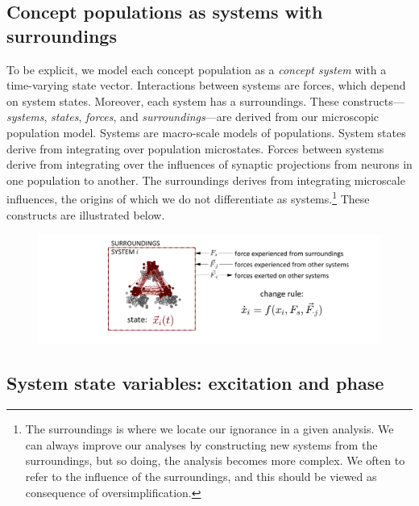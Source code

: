 \subsection{{\textbf{Concept populations as systems with surroundings}}} 

To be explicit, we model each concept population as a \textit{concept system} with a time-varying state vector. Interactions between systems are forces, which depend on system states. Moreover, each system has a surroundings. These constructs—\textit{systems}, \textit{states}, \textit{forces}, and \textit{surroundings}—are derived from our microscopic population model. Systems are macro-scale models of populations. System states derive from integrating over population microstates. Forces between systems derive from integrating over the influences of synaptic projections from neurons in one population to another. The surroundings derives from integrating microscale influences, the origins of which we do not differentiate as systems.\footnote{The surroundings is where we locate our ignorance in a given analysis. We can always improve our analyses by constructing new systems from the surroundings, but so doing, the analysis becomes more complex. We often to refer to the influence of the surroundings, and this should be viewed as consequence of oversimplification.} These constructs are illustrated below.

  
\begin{figure}
\includegraphics[width=\textwidth]{figures/Tilsen-img11.png}
\caption{\missingcaption}
\label{fig:2:4}
\end{figure}
 

\subsection{System state variables: excitation and phase}

